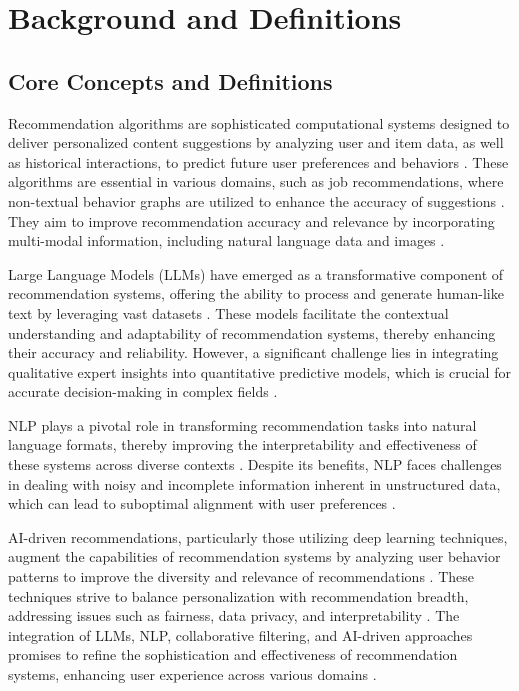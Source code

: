 \section{Background and Definitions} \label{sec:Background and Definitions}



\subsection{Core Concepts and Definitions} \label{subsec:Core Concepts and Definitions}



Recommendation algorithms are sophisticated computational systems designed to deliver personalized content suggestions by analyzing user and item data, as well as historical interactions, to predict future user preferences and behaviors . These algorithms are essential in various domains, such as job recommendations, where non-textual behavior graphs are utilized to enhance the accuracy of suggestions \cite{wu2023exploringlargelanguagemodel}. They aim to improve recommendation accuracy and relevance by incorporating multi-modal information, including natural language data and images \cite{tian2024mmrecllmbasedmultimodal}.



Large Language Models (LLMs) have emerged as a transformative component of recommendation systems, offering the ability to process and generate human-like text by leveraging vast datasets \cite{wang2023multiple}. These models facilitate the contextual understanding and adaptability of recommendation systems, thereby enhancing their accuracy and reliability. However, a significant challenge lies in integrating qualitative expert insights into quantitative predictive models, which is crucial for accurate decision-making in complex fields \cite{wang2023recmind}.



NLP plays a pivotal role in transforming recommendation tasks into natural language formats, thereby improving the interpretability and effectiveness of these systems across diverse contexts \cite{lee2024llm2llmboostingllmsnovel}. Despite its benefits, NLP faces challenges in dealing with noisy and incomplete information inherent in unstructured data, which can lead to suboptimal alignment with user preferences \cite{hua2023tutorial}.



AI-driven recommendations, particularly those utilizing deep learning techniques, augment the capabilities of recommendation systems by analyzing user behavior patterns to improve the diversity and relevance of recommendations \cite{bacciu2024generatingqueryrecommendationsllms}. These techniques strive to balance personalization with recommendation breadth, addressing issues such as fairness, data privacy, and interpretability \cite{hua2023tutorial}. The integration of LLMs, NLP, collaborative filtering, and AI-driven approaches promises to refine the sophistication and effectiveness of recommendation systems, enhancing user experience across various domains \cite{lee2024llm2llmboostingllmsnovel}.



